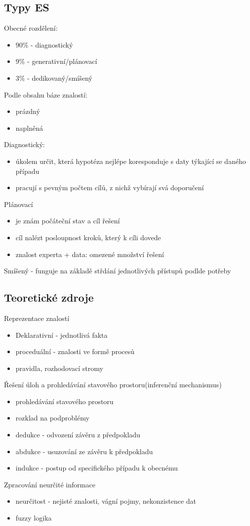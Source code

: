 \subsection{Typy ES}
Obecné rozdělení:
\begin{itemize}
    \item 90\% - diagnostický
    \item 9\% - generativní/plánovací
    \item 3\% - dedikovaný/smíšený
\end{itemize}
Podle obsahu báze znalostí:
\begin{itemize}
    \item prázdný
    \item naplněná
\end{itemize}

Diagnostický:
\begin{itemize}
    \item úkolem určit, která hypotéza nejlépe koresponduje s daty týkající se daného případu
    \item pracují s pevným počtem cílů, z nichž vybírají svá doporučení
\end{itemize}
Plánovací
\begin{itemize}
    \item je znám počáteční stav a cíl řešení
    \item cíl nalézt posloupnost kroků, který k cíli dovede
    \item znalost experta + data: omezené množství řešení
\end{itemize}

Smíšený - funguje na základě střdání jednotlivých přístupů podlde potřeby\\

\subsection{Teoretické zdroje}
Reprezentace znalostí
\begin{itemize}
    \item Deklarativní - jednotlivá fakta
    \item proceduální - znalosti ve formě procesů
    \item pravidla, rozhodovací stromy
\end{itemize}
Řešení úloh a prohledávání stavového prostoru(inferenční mechanismus)
\begin{itemize}
    \item prohledávání stavového prostoru
    \item rozklad na podproblémy
    \item dedukce - odvození závěru z předpokladu
    \item abdukce - usuzování ze závěru k předpokladu
    \item indukce - postup od specifického případu k obecnému
\end{itemize}
Zpracování neurčité informace
\begin{itemize}
    \item neurčitost - nejisté znalosti, vágní pojmy, nekonzistence dat
    \item fuzzy logika
\end{itemize}

